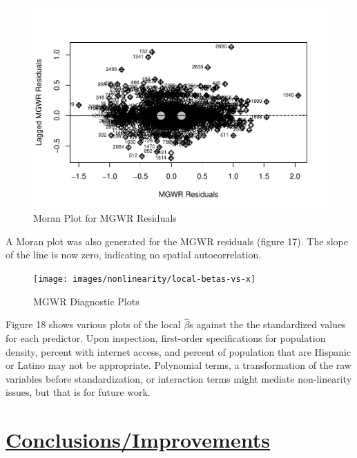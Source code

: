 \documentclass[
]{article}
\begin{document}
\newpage

\begin{figure}[H]

{\centering \includegraphics[width=1\linewidth]{final-project-write-up-nathan-nguyen_files/figure-latex/unnamed-chunk-21-1} 

}

\caption{Moran Plot for MGWR Residuals}\label{fig:unnamed-chunk-21}
\end{figure}

A Moran plot was also generated for the MGWR residuals (figure 17). The
slope of the line is now zero, indicating no spatial autocorrelation.

\newpage

\begin{figure}[H]

{\centering \texttt{[image: images/nonlinearity/local-betas-vs-x]} 

}

\caption{MGWR Diagnostic Plots}\label{fig:unnamed-chunk-22}
\end{figure}

Figure 18 shows various plots of the local \(\hat{\beta}\)s against the
the standardized values for each predictor. Upon inspection, first-order
specifications for population density, percent with internet access, and
percent of population that are Hispanic or Latino may not be
appropriate. Polynomial terms, a transformation of the raw variables
before standardization, or interaction terms might mediate non-linearity
issues, but that is for future work.

\newpage

\section{\texorpdfstring{\ul{Conclusions/Improvements}}{Conclusions/Improvements}}\label{conclusionsimprovements}
\end{document}
